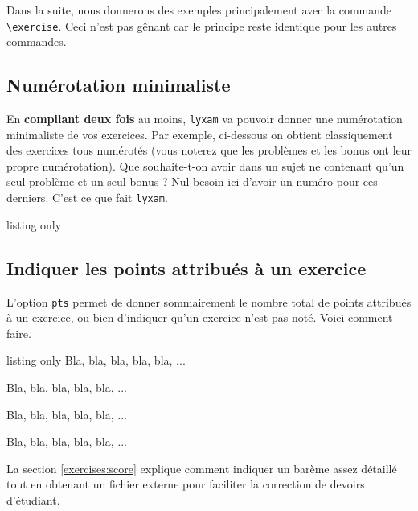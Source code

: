 \documentclass[12pt,a4paper]{scrartcl}
\begin{document}
Dans la suite, nous donnerons des exemples principalement avec la commande \verb+\exercise+. Ceci n'est pas gênant car le principe reste identique pour les autres commandes.


    \subsection{Numérotation minimaliste}

En \textbf{compilant deux fois} au moins, \verb+lyxam+ va pouvoir donner une numérotation minimaliste de vos exercices.
Par exemple, ci-dessous on obtient classiquement des exercices tous numérotés (vous noterez que les problèmes et les bonus ont leur propre numérotation).
Que souhaite-t-on avoir dans un sujet ne contenant qu'un seul problème et un seul bonus ? Nul besoin ici d'avoir un numéro pour ces derniers. C'est ce que fait \verb+lyxam+.

\resetallcnt{}

\begin{tcblisting}{listing only}
\exercise
\exercise
\problem
\bonus
\end{tcblisting}

\examplestart{}
\exercise
\exercise
\problem
\bonus
\exampleend{}



    \subsection{Indiquer les points attribués à un exercice}

L'option \verb+pts+ permet de donner sommairement le nombre total de points attribués à un exercice, ou bien d'indiquer qu'un exercice n'est pas noté. Voici comment faire.

\resetallcnt{}

\begin{tcblisting}{listing only}
\exercise[pts = 5]
Bla, bla, bla, bla, bla, ...

\exercise[pts = 0]
Bla, bla, bla, bla, bla, ...
\end{tcblisting}

\examplestart{}
\exercise[pts = 5]
Bla, bla, bla, bla, bla, ...

\exercise[pts = 0]
Bla, bla, bla, bla, bla, ...
\exampleend{}

\begin{remark*}
La section \ref{exercises:score} explique comment indiquer un barème assez détaillé tout en obtenant un fichier externe pour faciliter la correction de devoirs d'étudiant.
\end{remark*}
\end{document}
